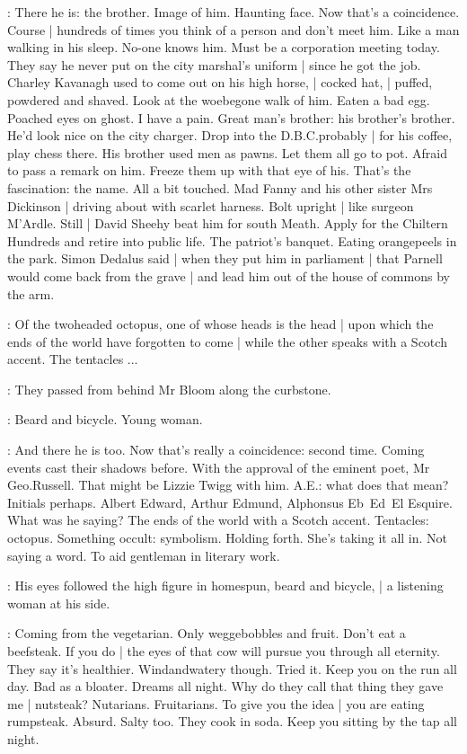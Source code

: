 \BloomInt:
There he is:
the brother.
Image of him.
Haunting face.
Now that's a coincidence.
Course |
hundreds of times you think of a person and don't meet him.
Like a man walking in his sleep.
No-one knows him.
Must be a corporation meeting today.
They say he never put on the city marshal's uniform |
since he got the job.
Charley Kavanagh used to come out on his high horse, |
cocked hat, |
puffed, powdered and shaved.
Look at the woebegone walk of him.
Eaten a bad egg.
Poached eyes on ghost.
I have a pain.
Great man's brother:
his brother's brother.
He'd look nice on the city charger.
Drop into the D.B.C.\@ probably |
for his coffee,
play chess there.
His brother used men as pawns.
Let them all go to pot.
Afraid to pass a remark on him.
Freeze them up with that eye of his.
That's the fascination:
the name.
All a bit touched.
Mad Fanny and his other sister Mrs Dickinson |
driving about with scarlet harness.
Bolt upright |
like surgeon M'Ardle.
Still |
David Sheehy beat him for south Meath.
Apply for the Chiltern Hundreds and retire into public life.
The patriot's banquet.
Eating orangepeels in the park.
Simon Dedalus said |
when they put him in parliament |
that Parnell would come back from the grave |
and lead him out of the house of commons by the arm.

\AErussell:
Of the twoheaded octopus,
one of whose heads is the head |
upon which the ends of the world have forgotten to come |
while the other speaks with a Scotch accent.
The tentacles ...

:
They passed from behind Mr Bloom along the curbstone.

\BloomInt:
Beard and bicycle.
Young woman.

\BloomInt:
And there he is too.
Now that's really a coincidence:
second time.
Coming events cast their shadows before.
With the approval of the eminent poet,
Mr Geo.\@ Russell.
That might be Lizzie Twigg with him.
A.E.:
what does that mean?
Initials perhaps.
Albert Edward,
Arthur Edmund,
Alphonsus Eb~Ed~El Esquire.
What was he saying?
The ends of the world with a Scotch accent.
Tentacles:
octopus.
Something occult:
symbolism.
Holding forth.
She's taking it all in.
Not saying a word.
To aid gentleman in literary work.

:
His eyes followed the high figure in homespun,
beard and bicycle, |
a listening woman at his side.

\BloomInt:
Coming from the vegetarian.
Only weggebobbles and fruit.
Don't eat a beefsteak.
If you do |
the eyes of that cow will pursue you through all eternity.
They say it's healthier.
Windandwatery though.
Tried it.
Keep you on the run all day.
Bad as a bloater.
Dreams all night.
Why do they call that thing they gave me |
nutsteak?
Nutarians.
Fruitarians.
To give you the idea |
you are eating rumpsteak.
Absurd.
Salty too.
They cook in soda.
Keep you sitting by the tap all night.

